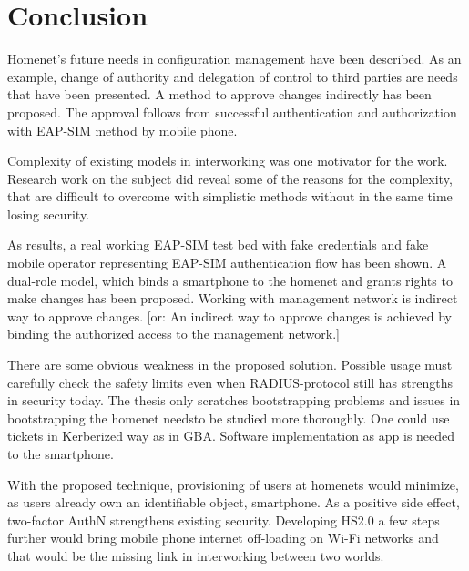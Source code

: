 \documentclass[12pt,a4paper,english]{tutthesis}
\begin{document}
\chapter{Conclusion}
\label{sec-8}




Homenet's future needs in configuration management have been
described. As an example, change of authority and delegation of
control to third parties are needs that have been presented.  A method to approve
changes indirectly has been proposed. The approval follows from
successful authentication and authorization with EAP-SIM method by
mobile phone. 



Complexity of existing models in interworking was one motivator for
the work. Research work on the subject did reveal some of the reasons 
for the complexity, that are difficult to overcome with simplistic 
methods without in the same time losing security.


As results, a real working EAP-SIM test bed with fake credentials and
fake mobile operator representing EAP-SIM authentication flow has been
shown.  A dual-role model, which binds a smartphone to the homenet and
grants rights to make changes has been proposed.  Working with
management network is indirect way to approve changes.  [or: An
indirect way to approve changes is achieved by binding the authorized
access to the management network.]


There are some obvious weakness in the proposed solution. Possible usage
must carefully check the safety limits even when RADIUS-protocol still
has strengths in security today. The thesis only scratches bootstrapping
problems and issues in bootstrapping the homenet needsto be studied
more thoroughly. One could use tickets in Kerberized way as in GBA.
Software implementation as app is needed to the smartphone.

With the proposed technique, provisioning of users at homenets would
minimize, as users already own an identifiable object, smartphone. As
a positive side effect, two-factor AuthN strengthens existing security.
Developing HS2.0 a few steps further would bring mobile phone internet
off-loading on Wi-Fi networks and that would be the missing link in
interworking between two worlds.

\newpage

\renewcommand{\bibname}{Bibliography}     %
\end{document}
